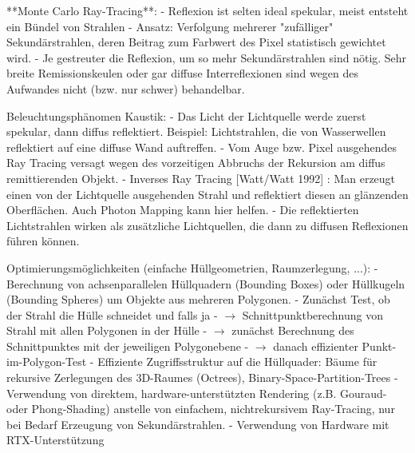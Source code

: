\documentclass[10pt,landscape]{article}
\begin{document}
\begin{multicols}{3}
  **Monte Carlo Ray-Tracing**:
  - Reflexion ist selten ideal spekular, meist entsteht ein Bündel von Strahlen
  - Ansatz: Verfolgung mehrerer "zufälliger" Sekundärstrahlen, deren Beitrag zum Farbwert des Pixel statistisch gewichtet wird.
  - Je gestreuter die Reflexion, um so mehr Sekundärstrahlen sind nötig. Sehr breite Remissionskeulen oder gar diffuse Interreflexionen sind wegen des Aufwandes nicht (bzw. nur schwer) behandelbar.
  
  Beleuchtungsphänomen Kaustik:
  - Das Licht der Lichtquelle werde zuerst spekular, dann diffus reflektiert. Beispiel: Lichtstrahlen, die von Wasserwellen reflektiert auf eine diffuse Wand auftreffen.
  - Vom Auge bzw. Pixel ausgehendes Ray Tracing versagt wegen des vorzeitigen Abbruchs der Rekursion am diffus remittierenden Objekt.
  - Inverses Ray Tracing [Watt/Watt 1992] : Man erzeugt einen von der Lichtquelle ausgehenden Strahl und reflektiert diesen an glänzenden Oberflächen. Auch Photon Mapping kann hier helfen.
  - Die reflektierten Lichtstrahlen wirken als zusätzliche Lichtquellen, die dann zu diffusen Reflexionen führen können.
  
  Optimierungsmöglichkeiten (einfache Hüllgeometrien, Raumzerlegung, ...):
  - Berechnung von achsenparallelen Hüllquadern (Bounding Boxes) oder Hüllkugeln (Bounding Spheres) um Objekte aus mehreren Polygonen.
  - Zunächst Test, ob der Strahl die Hülle schneidet und falls ja
  - $\rightarrow$ Schnittpunktberechnung von Strahl mit allen Polygonen in der Hülle
  - $\rightarrow$ zunächst Berechnung des Schnittpunktes mit der jeweiligen Polygonebene
  - $\rightarrow$ danach effizienter Punkt-im-Polygon-Test
  - Effiziente Zugriffsstruktur auf die Hüllquader: Bäume für rekursive Zerlegungen des 3D-Raumes (Octrees), Binary-Space-Partition-Trees
  - Verwendung von direktem, hardware-unterstützten Rendering (z.B. Gouraud- oder Phong-Shading) anstelle von einfachem, nichtrekursivem Ray-Tracing, nur bei Bedarf Erzeugung von Sekundärstrahlen.
  - Verwendung von Hardware mit RTX-Unterstützung
  

\end{multicols}
\end{document}

